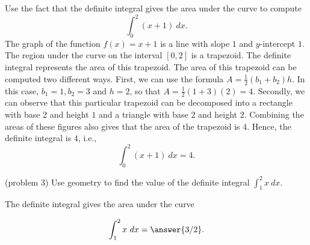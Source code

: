 \documentclass[handout]{ximera}
\begin{document}
\begin{example}[example 3]
Use the fact that the definite integral gives the area under the curve to compute
\[\int_0^2 (x+1) \ dx.\]
The graph of the function $f(x) = x+1$ is a line with slope $1$ and $y$-intercept $1$. 
The region under the curve on the interval $[0, 2]$ is a trapezoid.  
The definite integral represents the area of this trapezoid. The area of this trapezoid can be computed two different ways.  
First, we can use the formula $A = \frac12 (b_1 + b_2)h$. 
In this case, $b_1 = 1, b_2 = 3$ and $h = 2$, so that $A = \frac12 (1+3)(2) = 4$.  
Secondly, we can observe that this particular trapezoid can be decomposed into a 
rectangle with base $2$ and height $1$ and a triangle with base $2$ and height $2$. 
Combining the areas of these figures also gives that the area of the trapezoid is $4$.
Hence, the definite integral is $4$, i.e.,
\[\int_0^2 (x+1) \ dx = 4.\]
 




\begin{image}
\end{image}

\end{example}


\begin{problem}(problem 3)
Use geometry to find the value of the definite integral $\displaystyle{\int_{1}^{2} x \ dx}.$
\begin{hint}
The definite integral gives the area under the curve
\end{hint}
\[\int_{1}^{2} x \ dx = \answer{3/2}.\]
\end{problem}
\end{document}
